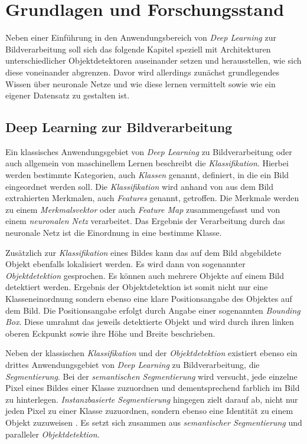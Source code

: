 \chapter{Grundlagen und Forschungsstand}

Neben einer Einführung in den Anwendungsbereich von \textit{Deep Learning} zur Bildverarbeitung soll sich das folgende Kapitel speziell mit Architekturen unterschiedlicher Objektdetektoren auseinander setzen und herausstellen, wie sich diese voneinander abgrenzen. Davor wird allerdings zunächst grundlegendes Wissen über neuronale Netze und wie diese \glqq lernen\grqq{} vermittelt sowie wie ein eigener Datensatz zu gestalten ist.

\section{Deep Learning zur Bildverarbeitung}

Ein klassisches Anwendungsgebiet von \textit{Deep Learning} zu Bildverarbeitung oder auch allgemein von maschinellem Lernen beschreibt die \textit{Klassifikation}. Hierbei werden bestimmte Kategorien, auch \textit{Klassen} genannt, definiert, in die ein Bild eingeordnet werden soll. Die \textit{Klassifikation} wird anhand von aus dem Bild extrahierten Merkmalen, auch \textit{Features} genannt, getroffen. Die Merkmale werden zu einem \textit{Merkmalsvektor} oder auch \textit{Feature Map} zusammengefasst und von einem \textit{neuronalen Netz} verarbeitet. Das Ergebnis der Verarbeitung durch das neuronale Netz ist die Einordnung in eine bestimme Klasse. 

Zusätzlich zur \textit{Klassifikation} eines Bildes kann das auf dem Bild abgebildete Objekt ebenfalls lokalisiert werden. Es wird dann von sogenannter \textit{Objektdetektion} gesprochen. Es können auch mehrere Objekte auf einem Bild detektiert werden. Ergebnis der Objektdetektion ist somit nicht nur eine Klasseneinordnung sondern ebenso eine klare Positionsangabe des Objektes auf dem Bild. Die Positionsangabe erfolgt durch Angabe einer sogenannten \textit{Bounding Box}. Diese umrahmt das jeweils detektierte Objekt und wird durch ihren linken oberen Eckpunkt sowie ihre Höhe und Breite beschrieben. 

Neben der klassischen \textit{Klassifikation} und der \textit{Objektdetektion} existiert ebenso ein drittes Anwendungsgebiet von \textit{Deep Learning} zu Bildverarbeitung, die \textit{Segmentierung}. Bei der \textit{semantischen Segmentierung} wird versucht, jede einzelne Pixel eines Bildes einer Klasse zuzuordnen und dementsprechend farblich im Bild zu hinterlegen. \textit{Instanzbasierte Segmentierung} hingegen zielt darauf ab, nicht nur jeden Pixel zu einer Klasse zuzuordnen, sondern ebenso eine Identität zu einem Objekt zuzuweisen \cite{RavindraParmar.20180902}. Es setzt sich zusammen aus \textit{semantischer Segmentierung} und paralleler \textit{Objektdetektion}.

